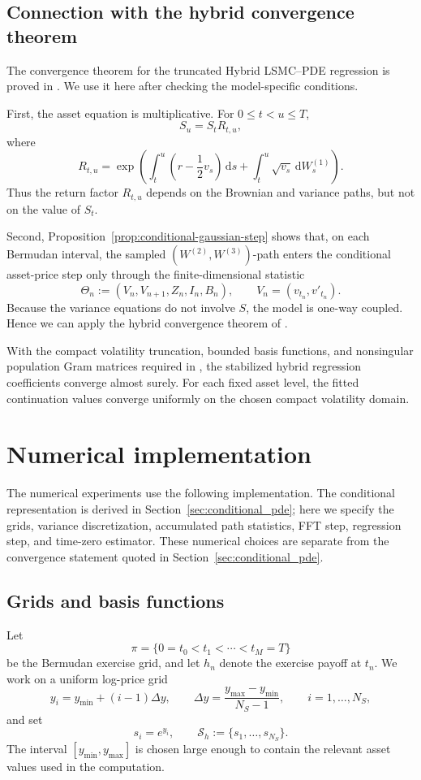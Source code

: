\documentclass[pdflatex,sn-mathphys-num]{sn-jnl}
\theoremstyle{thmstyleone}%
\theoremstyle{thmstylethree}%
\theoremstyle{thmstyletwo}%
\newcommand{\dd}{\mathrm d}
\begin{document}
\subsection{Connection with the hybrid convergence theorem}\label{sec:as_convergence}

The convergence theorem for the truncated Hybrid LSMC--PDE regression is proved
in \cite{farahany2020mixing}. We use it here after checking the model-specific
conditions.

First, the asset equation is multiplicative. For $0\le t<u\le T$,
$$
S_u=S_tR_{t,u},
$$
where
$$
R_{t,u}
=
\exp\left(
\int_t^u\left(r-\frac12v_s\right)\,\dd s
+
\int_t^u\sqrt{v_s}\,\dd W_s^{(1)}
\right).
$$
Thus the return factor $R_{t,u}$ depends on the Brownian and variance paths,
but not on the value of $S_t$.

Second, Proposition~\ref{prop:conditional-gaussian-step} shows that, on each
Bermudan interval, the sampled $(W^{(2)},W^{(3)})$-path enters the conditional
asset-price step only through the finite-dimensional statistic
$$
\Theta_n
:=
(V_n,V_{n+1},Z_n,I_n,B_n),
\qquad
V_n=(v_{t_n},v'_{t_n}).
$$
Because the variance equations do not involve $S$, the model is one-way
coupled. Hence we can apply the hybrid convergence theorem of
\cite[Theorem~1]{farahany2020mixing}.

With the compact volatility truncation, bounded basis functions, and nonsingular
population Gram matrices required in \cite{farahany2020mixing}, the stabilized
hybrid regression coefficients converge almost surely. For each fixed asset
level, the fitted continuation values converge uniformly on the chosen compact
volatility domain.

\section{Numerical implementation}
\label{sec:hybrid-method}

The numerical experiments use the following implementation. The conditional
representation is derived in Section~\ref{sec:conditional_pde}; here we specify
the grids, variance discretization, accumulated path statistics, FFT step,
regression step, and time-zero estimator. These numerical choices are separate
from the convergence statement quoted in Section~\ref{sec:conditional_pde}.

\subsection{Grids and basis functions}
Let
$$
\pi=\{0=t_0<t_1<\cdots<t_M=T\}
$$
be the Bermudan exercise grid, and let $h_n$ denote the exercise payoff at
$t_n$. We work on a uniform log-price grid
$$
y_i=y_{\min}+(i-1)\Delta y,
\qquad
\Delta y=\frac{y_{\max}-y_{\min}}{N_S-1},
\qquad
i=1,\ldots,N_S,
$$
and set
$$
s_i=e^{y_i},
\qquad
\mathcal S_h:=\{s_1,\ldots,s_{N_S}\}.
$$
The interval $[y_{\min},y_{\max}]$ is chosen large enough to contain the
relevant asset values used in the computation.
\end{document}
